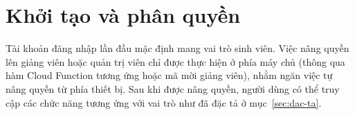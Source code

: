 \documentclass[../main.tex]{subfiles}
\begin{document}
\section{Khởi tạo và phân quyền}

Tài khoản đăng nhập lần đầu mặc định mang vai trò sinh viên. Việc nâng quyền lên giảng viên
hoặc quản trị viên chỉ được thực hiện ở phía máy chủ (thông qua hàm Cloud Function tương ứng
hoặc mã mời giảng viên), nhằm ngăn việc tự nâng quyền từ phía thiết bị. Sau khi được nâng
quyền, người dùng có thể truy cập các chức năng tương ứng với vai trò như đã đặc tả ở
mục~\ref{sec:dac-ta}.
\end{document}
